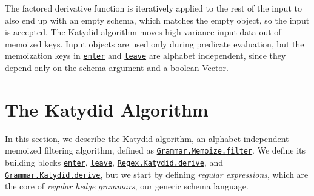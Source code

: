 \documentclass[runningheads]{llncs}
\providecommand{\Description}[2][]{}
\newcommand{\link}[2]{\mbox{\hyperref[#2]{\lstinline{#1}}}\xspace}
\newcommand{\GrammarKatydidDerive}{\link{Grammar.Katydid.derive}{def Grammar.Katydid.derive}}
\newcommand{\RegexKatydidDerive}{\link{Regex.Katydid.derive}{def Regex.Katydid.derive}}
\newcommand{\enter}{\link{enter}{def enter}}
\newcommand{\leave}{\link{leave}{def leave}}
\newcommand{\GrammarMemoizeFilter}{\link{Grammar.Memoize.filter}{def Grammar.Memoize.filter}}
\begin{document}
\begin{table}
\caption{The bounded memoization tables for \enter and \leave}
\label{table_memo}
\small
\Description[Two memoization tables]{The enter table maps a Schema to its Vector of predicate/schema pairs. The leave table maps a pair of a Schema and a boolean Vector to a residual Schema. Two different inputs that evaluate to the same boolean Vector share a single leave entry.}
\end{table}

The factored derivative function is iteratively applied to the rest of the input to also end up with an empty schema, which matches the empty object, so the input is accepted.
The Katydid algorithm moves high-variance input data out of memoized keys.
Input objects are used only during predicate evaluation, but the memoization keys in \enter and \leave are alphabet independent, since they depend only on the schema argument and a boolean Vector.

\section{The Katydid Algorithm}\label{section_algorithm}

In this section, we describe the Katydid algorithm, an alphabet independent memoized filtering algorithm, defined as \GrammarMemoizeFilter.
We define its building blocks \enter, \leave, \RegexKatydidDerive, and \GrammarKatydidDerive, but we start by defining \emph{regular expressions}, which are the core of \emph{regular hedge grammars}, our generic schema language.
\end{document}
